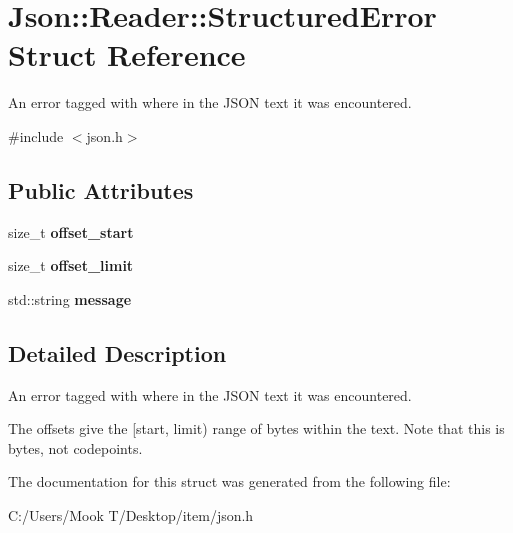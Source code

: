 \hypertarget{struct_json_1_1_reader_1_1_structured_error}{}\section{Json\+:\+:Reader\+:\+:Structured\+Error Struct Reference}
\label{struct_json_1_1_reader_1_1_structured_error}


An error tagged with where in the J\+S\+O\+N text it was encountered.  




{\ttfamily \#include $<$json.\+h$>$}

\subsection*{Public Attributes}
\begin{DoxyCompactItemize}
\item 
\hypertarget{struct_json_1_1_reader_1_1_structured_error_a160dae4eb3464a2209b743c755baf65f}{}size\+\_\+t {\bfseries offset\+\_\+start}\label{struct_json_1_1_reader_1_1_structured_error_a160dae4eb3464a2209b743c755baf65f}

\item 
\hypertarget{struct_json_1_1_reader_1_1_structured_error_a80747dae744bcc80a9bc81c94fd42e13}{}size\+\_\+t {\bfseries offset\+\_\+limit}\label{struct_json_1_1_reader_1_1_structured_error_a80747dae744bcc80a9bc81c94fd42e13}

\item 
\hypertarget{struct_json_1_1_reader_1_1_structured_error_ab8755e5201b78c6ae077338f8819e6e6}{}std\+::string {\bfseries message}\label{struct_json_1_1_reader_1_1_structured_error_ab8755e5201b78c6ae077338f8819e6e6}

\end{DoxyCompactItemize}


\subsection{Detailed Description}
An error tagged with where in the J\+S\+O\+N text it was encountered. 

The offsets give the \mbox{[}start, limit) range of bytes within the text. Note that this is bytes, not codepoints. 

The documentation for this struct was generated from the following file\+:\begin{DoxyCompactItemize}
\item 
C\+:/\+Users/\+Mook T/\+Desktop/item/json.\+h\end{DoxyCompactItemize}
